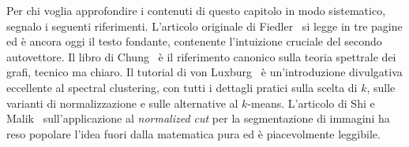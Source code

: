 \begin{biblioparvabox}
Per chi voglia approfondire i contenuti di questo capitolo
in modo sistematico, segnalo i seguenti riferimenti.
L'articolo originale di Fiedler~\parencite{fiedler1973} si
legge in tre pagine ed \`e ancora oggi il testo fondante,
contenente l'intuizione cruciale del secondo autovettore.
Il libro di Chung~\parencite{chung1997} \`e il riferimento
canonico sulla teoria spettrale dei grafi, tecnico ma
chiaro. Il tutorial di von Luxburg~\parencite{vonluxburg2007}
\`e un'introduzione divulgativa eccellente al spectral
clustering, con tutti i dettagli pratici sulla scelta di $k$,
sulle varianti di normalizzazione e sulle alternative al
$k$-means. L'articolo di Shi e
Malik~\parencite{shi2000} sull'applicazione al
\emph{normalized cut} per la segmentazione di immagini ha
reso popolare l'idea fuori dalla matematica pura ed \`e
piacevolmente leggibile.
\end{biblioparvabox}
